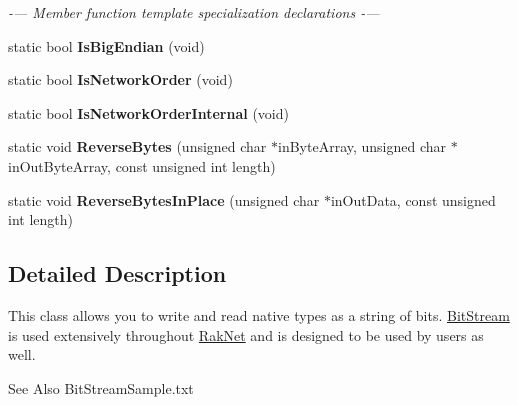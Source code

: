 \begin{DoxyCompactItemize}
\begin{DoxyCompactList}\small\item\em -\/--- Member function template specialization declarations -\/--- \end{DoxyCompactList}\item 
\hypertarget{class_rak_net_1_1_bit_stream_ab005e07868519830dd388cd266a43f7a}{static bool {\bfseries Is\-Big\-Endian} (void)}\label{class_rak_net_1_1_bit_stream_ab005e07868519830dd388cd266a43f7a}

\item 
\hypertarget{class_rak_net_1_1_bit_stream_a3148c68d1cb3b1364d0206a2655964e7}{static bool {\bfseries Is\-Network\-Order} (void)}\label{class_rak_net_1_1_bit_stream_a3148c68d1cb3b1364d0206a2655964e7}

\item 
\hypertarget{class_rak_net_1_1_bit_stream_a514d90516479c937f109e15fab1d9b04}{static bool {\bfseries Is\-Network\-Order\-Internal} (void)}\label{class_rak_net_1_1_bit_stream_a514d90516479c937f109e15fab1d9b04}

\item 
\hypertarget{class_rak_net_1_1_bit_stream_a25cf1cf843933257ab8fd745b1f758ad}{static void {\bfseries Reverse\-Bytes} (unsigned char $\ast$in\-Byte\-Array, unsigned char $\ast$in\-Out\-Byte\-Array, const unsigned int length)}\label{class_rak_net_1_1_bit_stream_a25cf1cf843933257ab8fd745b1f758ad}

\item 
\hypertarget{class_rak_net_1_1_bit_stream_a9720b28d572630b56ed48c0511214224}{static void {\bfseries Reverse\-Bytes\-In\-Place} (unsigned char $\ast$in\-Out\-Data, const unsigned int length)}\label{class_rak_net_1_1_bit_stream_a9720b28d572630b56ed48c0511214224}

\end{DoxyCompactItemize}


\subsection{Detailed Description}
This class allows you to write and read native types as a string of bits. \hyperlink{class_rak_net_1_1_bit_stream}{Bit\-Stream} is used extensively throughout \hyperlink{namespace_rak_net}{Rak\-Net} and is designed to be used by users as well. \begin{DoxySeeAlso}{See Also}
Bit\-Stream\-Sample.\-txt 
\end{DoxySeeAlso}


